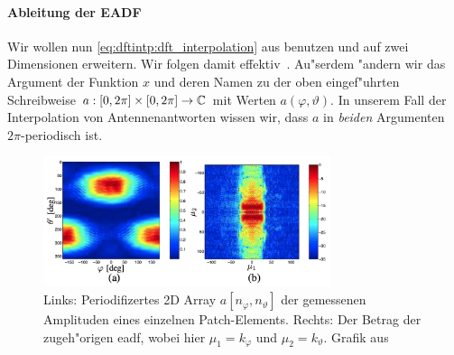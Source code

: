 \paragraph{Ableitung der EADF}
%
%
Wir wollen nun \eqref{eq:dftintp:dft_interpolation} aus  benutzen und auf zwei Dimensionen erweitern.
Wir folgen damit effektiv~\cite{landmann2004EADF}.
Au"serdem "andern wir das Argument der Funktion $x$ und deren Namen zu der oben eingef"uhrten Schreibweise $a : [0, 2 \pi] \times [0, 2 \pi] \rightarrow \mathbb{C}$ mit Werten $a(\varphi, \vartheta)$. 
In unserem Fall der Interpolation von Antennenantworten wissen wir, dass $a$ in \emph{beiden} Argumenten $2\pi$-periodisch ist.

\begin{figure}[t]
    \centering\includegraphics[width=0.75\textwidth]{img/eadf/bp_aperture.png}
    \caption{Links: Periodifizertes 2D Array $a[n_\varphi, n_\vartheta]$ der gemessenen Amplituden eines einzelnen Patch-Elements. Rechts: Der Betrag der zugeh"origen \gls{eadf}, wobei hier $\mu_1 = k_\varphi$ und $\mu_2 = k_\vartheta$. Grafik aus~\cite{landmann2004EADF}}\label{fig:eadf:bp_aperture}
\end{figure}

